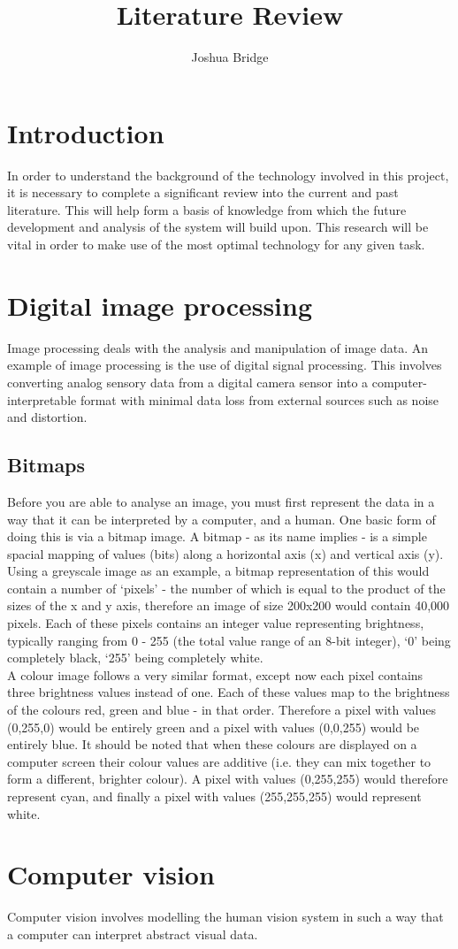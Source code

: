 \documentclass[a4paper,12pt]{article}
\title{Literature Review}
\author{Joshua Bridge}
\begin{document}
\maketitle

\tableofcontents

\section{Introduction}
  In order to understand the background of the technology involved in this project, it is necessary to complete a significant review into the current and past literature. This will help form a basis of knowledge from which the future development and analysis of the system will build upon. This research will be vital in order to make use of the most optimal technology for any given task.

\section{Digital image processing}
  Image processing deals with the analysis and manipulation of image data. An example of image processing is the use of digital signal processing. This involves converting analog sensory data from a digital camera sensor into a computer-interpretable format with minimal data loss from external sources such as noise and distortion.\\

  \subsection{Bitmaps}
  Before you are able to analyse an image, you must first represent the data in a way that it can be interpreted by a computer, and a human. One basic form of doing this is via a bitmap image. A bitmap - as its name implies - is a simple spacial mapping of values (bits) along a horizontal axis (x) and vertical axis (y). Using a greyscale image as an example, a bitmap representation of this would contain a number of ‘pixels’ - the number of which is equal to the product of the sizes of the x and y axis, therefore an image of size 200x200 would contain 40,000 pixels. Each of these pixels contains an integer value representing brightness, typically ranging from 0 - 255 (the total value range of an 8-bit integer), ‘0’ being completely black, ‘255’ being completely white.\\

  A colour image follows a very similar format, except now each pixel contains three brightness values instead of one. Each of these values map to the brightness of the colours red, green and blue - in that order. Therefore a pixel with values (0,255,0) would be entirely green and a pixel with values (0,0,255) would be entirely blue. It should be noted that when these colours are displayed on a computer screen their colour values are additive (i.e. they can mix together to form a different, brighter colour). A pixel with values (0,255,255) would therefore represent cyan, and finally a pixel with values (255,255,255) would represent white.

\section{Computer vision}
  Computer vision involves modelling the human vision system in such a way that a computer can interpret abstract visual data.



\end{document}
